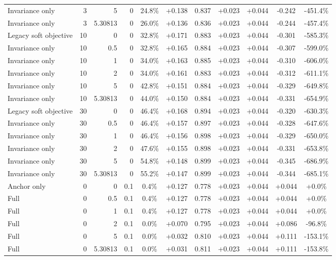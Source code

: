 \begin{table}[htbp]
\begin{tabular}{lrrrccccccc}
Invariance only & 3 & 5 & 0 & 24.8\% & +0.138 & 0.837 & +0.023 & +0.044 & -0.242 & -451.4\% \\
Invariance only & 3 & 5.30813 & 0 & 26.0\% & +0.136 & 0.836 & +0.023 & +0.044 & -0.244 & -457.4\% \\
Legacy soft objective & 10 & 0 & 0 & 32.8\% & +0.171 & 0.883 & +0.023 & +0.044 & -0.301 & -585.3\% \\
Invariance only & 10 & 0.5 & 0 & 32.8\% & +0.165 & 0.884 & +0.023 & +0.044 & -0.307 & -599.0\% \\
Invariance only & 10 & 1 & 0 & 34.0\% & +0.163 & 0.885 & +0.023 & +0.044 & -0.310 & -606.0\% \\
Invariance only & 10 & 2 & 0 & 34.0\% & +0.161 & 0.883 & +0.023 & +0.044 & -0.312 & -611.1\% \\
Invariance only & 10 & 5 & 0 & 42.8\% & +0.151 & 0.884 & +0.023 & +0.044 & -0.329 & -649.8\% \\
Invariance only & 10 & 5.30813 & 0 & 44.0\% & +0.150 & 0.884 & +0.023 & +0.044 & -0.331 & -654.9\% \\
Legacy soft objective & 30 & 0 & 0 & 46.4\% & +0.168 & 0.894 & +0.023 & +0.044 & -0.320 & -630.3\% \\
Invariance only & 30 & 0.5 & 0 & 46.4\% & +0.157 & 0.897 & +0.023 & +0.044 & -0.328 & -647.6\% \\
Invariance only & 30 & 1 & 0 & 46.4\% & +0.156 & 0.898 & +0.023 & +0.044 & -0.329 & -650.0\% \\
Invariance only & 30 & 2 & 0 & 47.6\% & +0.155 & 0.898 & +0.023 & +0.044 & -0.331 & -653.8\% \\
Invariance only & 30 & 5 & 0 & 54.8\% & +0.148 & 0.899 & +0.023 & +0.044 & -0.345 & -686.9\% \\
Invariance only & 30 & 5.30813 & 0 & 55.2\% & +0.147 & 0.899 & +0.023 & +0.044 & -0.344 & -685.1\% \\
Anchor only & 0 & 0 & 0.1 & 0.4\% & +0.127 & 0.778 & +0.023 & +0.044 & +0.044 & +0.0\% \\
Full & 0 & 0.5 & 0.1 & 0.4\% & +0.127 & 0.778 & +0.023 & +0.044 & +0.044 & +0.0\% \\
Full & 0 & 1 & 0.1 & 0.4\% & +0.127 & 0.778 & +0.023 & +0.044 & +0.044 & +0.0\% \\
Full & 0 & 2 & 0.1 & 0.0\% & +0.070 & 0.795 & +0.023 & +0.044 & +0.086 & -96.8\% \\
Full & 0 & 5 & 0.1 & 0.0\% & +0.032 & 0.810 & +0.023 & +0.044 & +0.111 & -153.1\% \\
Full & 0 & 5.30813 & 0.1 & 0.0\% & +0.031 & 0.811 & +0.023 & +0.044 & +0.111 & -153.8\% \\

\end{tabular}
\end{table}
